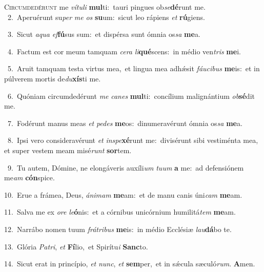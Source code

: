 \lettrine{\initial\textcolor{\initialcolor}{C}}{ircumdedérunt} me \textit{ví}\-\textit{tu}\textit{li} \textbf{mul}\-ti:~\star tauri pingues ob\-\textit{se}\-\textbf{dé}runt me.\\
{\numbfont\textcolor{\numbcolor}{~2.}}~Aperuérunt su\textit{per} \textit{me} \textit{os} \textbf{su}\-um:~\star sicut leo rápiens \textit{et} \textbf{rú}\-giens.\par
{\numbfont\textcolor{\numbcolor}{~3.}}~Sicut \textit{a}\-\textit{qua} \textit{ef}\-\textbf{fú}sus sum:~\star et dispérsa sunt ómnia os\textit{sa} \textbf{me}\-a.\par
{\numbfont\textcolor{\numbcolor}{~4.}}~Factum est cor meum tamquam \textit{ce}\-\textit{ra} \textit{li}\-\textbf{qué}scens:~\star in médio ven\textit{tris} \textbf{me}\-i.\par
{\numbfont\textcolor{\numbcolor}{~5.}}~Aruit tamquam testa virtus mea,~\dagger et lingua mea adhǽsit \textit{fáu}\-\textit{ci}\textit{bus} \textbf{me}\-is:~\star et in púlverem mortis de\-\textit{du}\-\textbf{xís}ti me.\par
{\numbfont\textcolor{\numbcolor}{~6.}}~Quóniam circumdedérunt \textit{me} \textit{ca}\-\textit{nes} \textbf{mul}\-ti:~\star concílium malignántium \textit{ob}\-\textbf{sé}dit me.\par
{\numbfont\textcolor{\numbcolor}{~7.}}~Fodérunt manus meas \textit{et} \textit{pe}\-\textit{des} \textbf{me}\-os:~\star dinumeravérunt ómnia os\textit{sa} \textbf{me}\-a.\par
{\numbfont\textcolor{\numbcolor}{~8.}}~Ipsi vero consideravérunt \textit{et} \textit{in}\-\textit{spe}\textbf{xé}runt me:~\star divisérunt sibi vestiménta mea, et super vestem meam misé\textit{runt} \textbf{sor}\-tem.\par
{\numbfont\textcolor{\numbcolor}{~9.}}~Tu autem, Dómine, ne elongáveris auxíli\textit{um} \textit{tu}\-\textit{um} \textbf{a} me:~\star ad defensiónem me\textit{am} \textbf{cón}\-spice.\par
{\numbfont\textcolor{\numbcolor}{10.}}~Erue a frámea, Deus, \textit{á}\-\textit{ni}\textit{mam} \textbf{me}\-am:~\star et de manu canis úni\textit{cam} \textbf{me}\-am.\par
{\numbfont\textcolor{\numbcolor}{11.}}~Salva me ex \textit{o}\-\textit{re} \textit{le}\-\textbf{ó}nis:~\star et a córnibus unicórnium humilitá\textit{tem} \textbf{me}\-am.\par
{\numbfont\textcolor{\numbcolor}{12.}}~Narrábo nomen tuum \textit{frá}\-\textit{tri}\textit{bus} \textbf{me}\-is:~\star in médio Ecclésiæ \textit{lau}\-\textbf{dá}bo te.\par
{\numbfont\textcolor{\numbcolor}{13.}}~Glória \textit{Pa}\-\textit{tri}, \textit{et} \textbf{Fí}\-lio,~\star et Spirítu\textit{i} \textbf{Sanc}\-to.\par
{\numbfont\textcolor{\numbcolor}{14.}}~Sicut erat in princípio, \textit{et} \textit{nunc}\-, \textit{et} \textbf{sem}\-per,~\star et in sǽcula sæculó\-\textit{rum}\-. \textbf{A}\-men.\par
